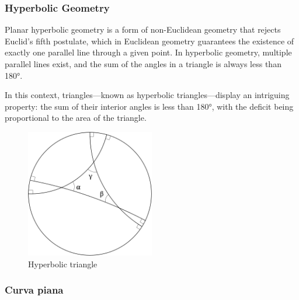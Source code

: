 \subsubsection{Hyperbolic Geometry}

Planar hyperbolic geometry is a form of non-Euclidean geometry that rejects Euclid’s fifth postulate, which in Euclidean geometry guarantees the existence of exactly one parallel line through a given point. In hyperbolic geometry, multiple parallel lines exist, and the sum of the angles in a triangle is always less than 180°.


In this context, triangles—known as hyperbolic triangles—display an intriguing property: the sum of their interior angles is less than 180°, with the deficit being proportional to the area of the triangle.

\begin{figure}[H]
    \centering
    \includegraphics[width=0.5\textwidth]{assets/hyperbolic_triangle.png}
    \caption{Hyperbolic triangle}
\end{figure}

\subsubsection{Curva piana}



